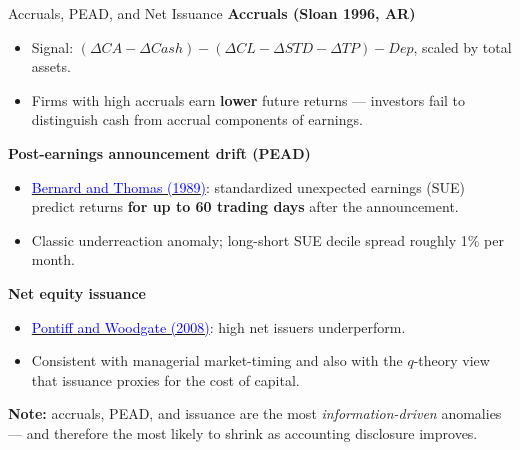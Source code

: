 \documentclass{beamer}
\begin{document}
\begin{frame}{Accruals, PEAD, and Net Issuance}
	\textbf{Accruals (Sloan 1996, AR)}
	\begin{itemize}
		\item Signal: $(\Delta CA - \Delta Cash) - (\Delta CL - \Delta STD - \Delta TP) - Dep$, scaled by total assets.
		\item Firms with high accruals earn \textbf{lower} future returns --- investors fail to distinguish cash from accrual components of earnings.
	\end{itemize}

	\textbf{Post-earnings announcement drift (PEAD)}
	\begin{itemize}
		\item \href{https://doi.org/10.2307/2491062}{\textcolor{blue}{Bernard and Thomas (1989)}}: standardized unexpected earnings (SUE) predict returns \textbf{for up to 60 trading days} after the announcement.
		\item Classic underreaction anomaly; long-short SUE decile spread roughly 1\% per month.
	\end{itemize}

	\textbf{Net equity issuance}
	\begin{itemize}
		\item \href{https://doi.org/10.1111/j.1540-6261.2008.01389.x}{\textcolor{blue}{Pontiff and Woodgate (2008)}}: high net issuers underperform.
		\item Consistent with managerial market-timing and also with the $q$-theory view that issuance proxies for the cost of capital.
	\end{itemize}

	\textbf{Note:} accruals, PEAD, and issuance are the most \emph{information-driven} anomalies --- and therefore the most likely to shrink as accounting disclosure improves.
\end{frame}
\end{document}
